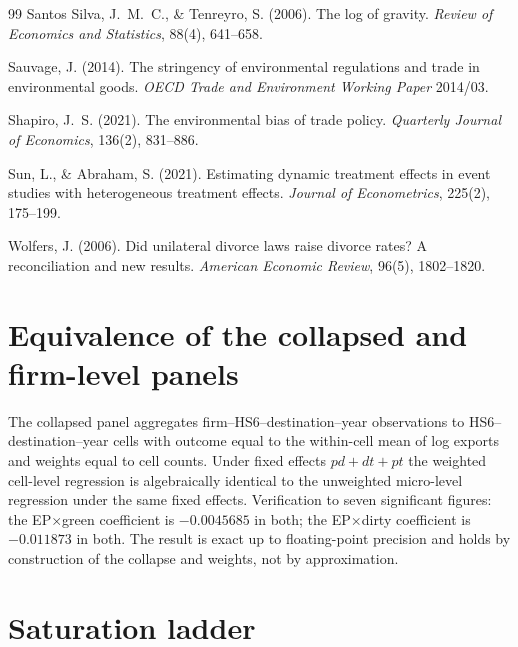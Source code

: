 \documentclass[12pt]{article}
\begin{document}
\begin{thebibliography}{99}
Santos Silva, J.~M.~C., \& Tenreyro, S. (2006).
The log of gravity.
\textit{Review of Economics and Statistics}, 88(4), 641--658.

Sauvage, J. (2014).
The stringency of environmental regulations and trade in environmental goods.
\textit{OECD Trade and Environment Working Paper} 2014/03.

Shapiro, J.~S. (2021).
The environmental bias of trade policy.
\textit{Quarterly Journal of Economics}, 136(2), 831--886.

Sun, L., \& Abraham, S. (2021).
Estimating dynamic treatment effects in event studies with heterogeneous treatment
effects.
\textit{Journal of Econometrics}, 225(2), 175--199.

Wolfers, J. (2006).
Did unilateral divorce laws raise divorce rates? A reconciliation and new results.
\textit{American Economic Review}, 96(5), 1802--1820.

\end{thebibliography}

\appendix

\section{Equivalence of the collapsed and firm-level panels}\label{app:pddt}

The collapsed panel aggregates firm--HS6--destination--year observations to
HS6--destination--year cells with outcome equal to the within-cell mean of log exports
and weights equal to cell counts. Under fixed effects $pd + dt + pt$ the weighted
cell-level regression is algebraically identical to the unweighted micro-level regression
under the same fixed effects. Verification to seven significant figures: the
EP$\times$green coefficient is $-0.0045685$ in both; the EP$\times$dirty coefficient is
$-0.011873$ in both. The result is exact up to floating-point precision and holds by
construction of the collapse and weights, not by approximation.

\section{Saturation ladder}\label{app:ladder}
\end{document}
